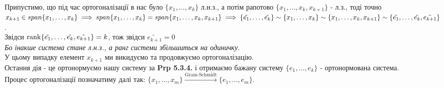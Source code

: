 \documentclass[a4paper, 10pt]{article}
\theoremstyle{theoremdd}
\theoremstyle{theoremdd}
\theoremstyle{theoremdd}
\theoremstyle{theoremdd}
\theoremstyle{theoremdd}
\theoremstyle{theoremdd}
\theoremstyle{theoremdd}
\theoremstyle{theoremdd}
\begin{document}
\bigskip \\
Припустимо, що під час ортогоналізації в нас було $\{x_1,\dots,x_k\}$ л.н.з., а потім рапотово $\{x_1,\dots,x_k, x_{k+1}\}$ - л.з., тоді точно $x_{k+1} \in span \{x_1,\dots,x_k\} \implies span \{x_1,\dots,x_k\} = span \{x_1,\dots,x_k,x_{k+1}\} \\ \implies \{\tilde{e_1},\dots,\tilde{e_k}\} \sim \{x_1,\dots,x_k\} \sim \{x_1,\dots,x_k,x_{k+1}\} \sim \{\tilde{e_1},\dots,\tilde{e_k},\tilde{e_{k+1}}\}$.\\
Звідси $\rank \{\tilde{e_1},\dots,\tilde{e_k},\tilde{e_{k+1}}\} = k$, тож звідси $\tilde{e_{k+1}} = 0$\\
\textit{Бо інакше система стане л.н.з., а ранг системи збільшиться на одиничку.}\\
У цьому випадку елемент $x_{k+1}$ ми викидуємо та продовжуємо ортогоналізацію.
\bigskip \\
Остання дія - це ортонормуємо нашу систему за \textbf{Prp 5.3.4.} і отримаємо бажану систему $\{e_1,\dots,e_k\}$ - ортонормована система.
\bigskip \\
Процес ортогоналізації позначатиму далі так: $\{x_1,\dots,x_m\} \overset{\text{Gram-Schmidt}}{\longrightarrow} \{e_1,\dots,e_m\}$.
\end{document}

